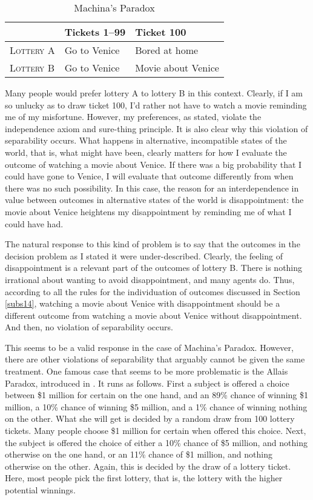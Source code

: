 \begin{table}[h]
\centering
  \begin{tabular}{lll}
  \hline
                      & Tickets 1--99 & Ticket 100\\\hline\hline
  \textsc{Lottery A}  & Go to Venice  & Bored at home \\
  \textsc{Lottery B}  & Go to Venice  & Movie about Venice\\
  \hline
  \end{tabular}
\caption{Machina's Paradox}
\label{t5}
\end{table}

Many people would prefer lottery A to lottery B in this context. Clearly, if I am so unlucky as to draw ticket 100, I'd rather not have to watch a movie reminding me of my misfortune. However, my preferences, as stated, violate the independence axiom and sure-thing principle. It is also clear why this violation of separability occurs. What happens in alternative, incompatible states of the world, that is, what might have been, clearly matters for how I evaluate the outcome of watching a movie about Venice. If there was a big probability that I could have gone to Venice, I will evaluate that outcome differently from when there was no such possibility. In this case, the reason for an interdependence in value between outcomes in alternative states of the world is disappointment: the movie about Venice heightens my disappointment by reminding me of what I could have had.

The natural response to this kind of problem is to say that the outcomes in the decision problem as I stated it were under-described. Clearly, the feeling of disappointment is a relevant part of the outcomes of lottery B. There is nothing irrational about wanting to avoid disappointment, and many agents do. Thus, according to all the rules for the individuation of outcomes discussed in Section \ref{subs14}, watching a movie about Venice with disappointment should be a different outcome from watching a movie about Venice without disappointment. And then, no violation of separability occurs.

This seems to be a valid response in the case of Machina's Paradox. However, there are other violations of separability that arguably cannot be given the same treatment. One famous case that seems to be more problematic is the Allais Paradox, introduced in \citet{Allais1953}. It runs as follows. First a subject is offered a choice between \$1 million for certain on the one hand, and an 89\% chance of winning \$1 million, a 10\% chance of winning \$5 million, and a 1\% chance of winning nothing on the other. What she will get is decided by a random draw from 100 lottery tickets. Many people choose \$1 million for certain when offered this choice. Next, the subject is offered the choice of either a 10\% chance of \$5 million, and nothing otherwise on the one hand, or an 11\% chance of \$1 million, and nothing otherwise on the other. Again, this is decided by the draw of a lottery ticket. Here, most people pick the first lottery, that is, the lottery with the higher potential winnings.

